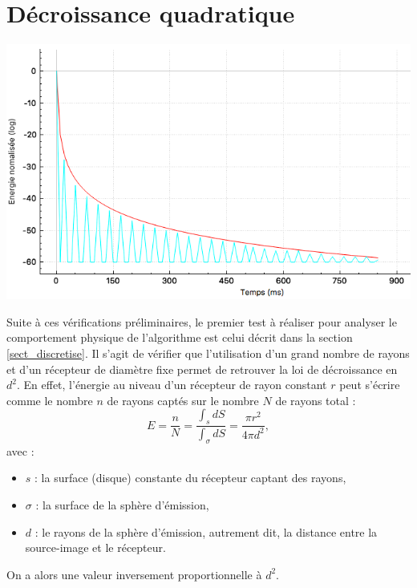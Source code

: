 \begin{figureth}
\begin{subfigureth}{0.45\textwidth}
		\caption{Propagation des rayons depuis les sources-images vers le récepteur à l'ordre 1.}
		\label{testBeam2}
	\end{subfigureth}
	\caption{Visualisation des rayons captés par le récepteur à l'ordre 0 (gauche) et 1 (droite) pour 100~000 rayons au total.}
	\label{testBeam}
\end{figureth}




\section{Décroissance quadratique}


\begin{figureth}
	\includegraphics[width=0.8\linewidth]{images/test1}
	\caption{Réponse impulsionnelle en espace libre pour 3 millions de rayons (bleu) échantillonnée à 100Hz et fonction $f(d)=\frac{2}{d^2}$ (rouge).}
	\label{test1}
\end{figureth}


Suite à ces vérifications préliminaires, le premier test à réaliser pour analyser le comportement physique de l'algorithme est celui décrit dans la section \ref{sect_discretise}. Il s'agit de vérifier que l'utilisation d'un grand nombre de rayons et d'un récepteur de diamètre fixe permet de retrouver la loi de décroissance en $d^2$. En effet, l'énergie au niveau d'un récepteur de rayon constant $r$ peut s'écrire comme le nombre $n$ de rayons captés sur le nombre $N$ de rayons total :
\begin{equation}
E = \frac{n}{N} = \frac{\int_s dS}{\int_{\sigma} dS} = \frac{\pi r^2}{4\pi d^2},
\end{equation}
avec :
\begin{itemize}
\item$s$ : la surface (disque) constante du récepteur captant des rayons,
\item$\sigma$ : la surface de la sphère d'émission,
\item$d$ : le rayons de la sphère d'émission, autrement dit, la distance entre la source-image et le récepteur.
\end{itemize}
On a alors une valeur inversement proportionnelle à $d^2$.

